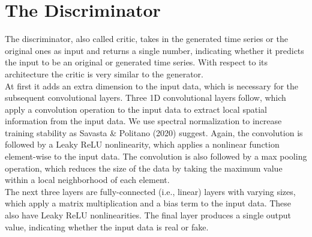 \documentclass{article}
\begin{document}
\section{The Discriminator}
The discriminator, also called critic, takes in the generated time series or the original ones as input and returns a single number, indicating whether it predicts the input to be an original or generated time series. With respect to its architecture the critic is very similar to the generator. \\
At first it adds an extra dimension to the input data, which is necessary for the subsequent convolutional layers. Three 1D convolutional layers follow, which apply a convolution operation to the input data to extract local spatial information from the input data. We use spectral normalization to increase training stability as Savasta \& Politano (2020) suggest. Again, the convolution is followed by a Leaky ReLU nonlinearity, which applies a nonlinear function element-wise to the input data. The convolution is also followed by a max pooling operation, which reduces the size of the data by taking the maximum value within a local neighborhood of each element. \\
The next three layers are fully-connected (i.e., linear) layers with varying sizes, which apply a matrix multiplication and a bias term to the input data. These also have Leaky ReLU nonlinearities. The final layer produces a single output value, indicating whether the input data is real or fake.



    \begin{multicols}{2}
    
    \end{multicols}
\end{document}

